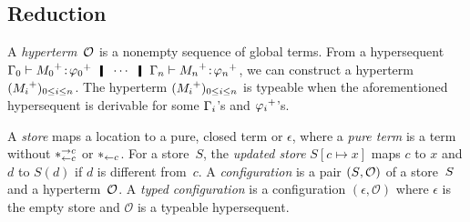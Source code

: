
\subsection{Reduction}

A \textit{hyperterm}~$\mathcal{O}$ is a nonempty sequence
of global terms.
From a hypersequent $\G_0\tr\tj{\m{M_0}}{\m{\phi_0}}\hmid \cdots \hmid
\G_n\tr\tj{\m{M_n}}{\m{\phi_n}}$,
we can construct a hyperterm $({M_i}^+)_{0\le i \le n}$.
The hyperterm $({M_i}^+)_{0\le i \le n}$ is typeable when the
aforementioned hypersequent is derivable for some $\Gamma_i$'s and ${\varphi_i}^+$'s.

A \textit{store} maps a location to a pure, closed term or $\epsilon$,
where a \textit{pure term} is a term
without $\ast^{\rightarrow {c}}_{\leftarrow{c}}$ or $\ast_{\leftarrow{c}}$.
For a store~$S$, the \textit{updated store} $S[c\mapsto x]$ maps $c$ to
$x$ and $d$ to $S(d)$ if $d$ is different from~$c$.
A \textit{configuration} is a pair $({S}{},{\mathcal{O}})$ of a
store~${S}$ and a hyperterm~$\mathcal{O}$.
A \textit{typed configuration} is a
configuration $(\epsilon, \mathcal O)$ where $\epsilon$ is the empty
store and $\mathcal O$ is a typeable hypersequent.

